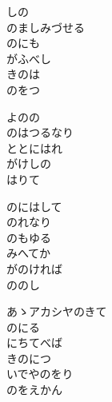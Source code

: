 \documentclass[10pt,b5j]{tarticle} %
\begin{document}
\vspace{1.5em} %
\newcommand{\linespace}{0.5em} %
\newcommand{\blocksize}{0.5\hsize} %
\begin{enumerate} %
    \begin{minipage}[c]{\blocksize}
    
        \vspace{\linespace}
        \item
        しの\\
        のましみづせる\\
        のにも\\
        がふべし\\
        きのは\\
        のをつ
        
        \vspace{\linespace}
        \item
        よのの\\
        のはつるなり\\
        ととにはれ\\
        がけしの\\
        はりて
        
        \vspace{\linespace}
        \item
        のにはして\\
        のれなり\\
        のもゆる\\
        みへてか\\
        がのければ\\
        ののし
        
        \vspace{\linespace}
        \item
        あゝアカシヤのきて\\
        のにる\\
        にちてべば\\
        きのにつ\\
        いでやのをり\\
        のをえかん
    
    \end{minipage}
\end{enumerate} %
\end{document}
